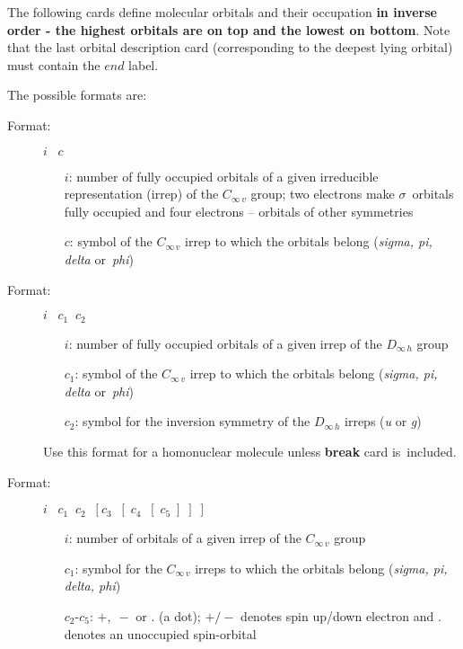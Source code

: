 \documentclass[10pt,a4paper]{article}
\begin{document}
\begin{description}
The following cards define molecular orbitals and their occupation
{\bf in inverse order - the highest orbitals are on top and the lowest
  on bottom}. Note that the last orbital description card
(corresponding to the deepest lying orbital) must contain the $end$
label.

The possible formats are:
\begin{description}
\item[Format:] $i\;\;\;c$
\begin{itemize}
\item[$i$:] number of fully occupied orbitals of a given irreducible
     representation (irrep) of the $C_{\infty\,v}$ group;
	two electrons make $\sigma$~orbitals fully occupied
     and four electrons -- orbitals of other symmetries
\item[$c$:] symbol of the $C_{\infty\,v}$ irrep to which the orbitals
     belong ({\it sigma, pi, delta} or~{\it phi})
\end{itemize}
\end{description}


\begin{description}
\item[Format:] $i\;\;\;c_1 \;\;c_2$
\begin{itemize}
\item[$i$:] number of fully occupied orbitals of a given irrep of the
$D_{\infty\,h}$ group
\item[$c_1$:] symbol of the $C_{\infty\,v}$ irrep to which the orbitals belong
       ({\it sigma, pi, delta} or~{\it phi})
\item[$c_2$:] symbol for the inversion symmetry of the $D_{\infty\,h}$ irreps
       ({\it u} or {\it g})
\end{itemize}
Use this format for a homonuclear molecule unless \textbf{break} card
is~included.
\end{description}


\begin{description}
\item[Format:]
$i\;\;\;c_1\;\;c_2\;\;[c_3\;\;[\;c_4\;\;[\;c_5\;]\;]\;]$
\begin{itemize}
\item[$i$:] number of orbitals of a given irrep of the $C_{\infty\,v}$  group
\item[$c_1$:] symbol for the $C_{\infty\,v}$ irreps to which the
orbitals belong ({\it sigma, pi, delta, phi})
\item[$c_2$-$c_5$:] $+,\;-$ or . (a dot); $+/-$ denotes spin up/down
electron and . denotes an unoccupied spin-orbital
\end{itemize}
\end{description}


\end{description}
\end{document}

